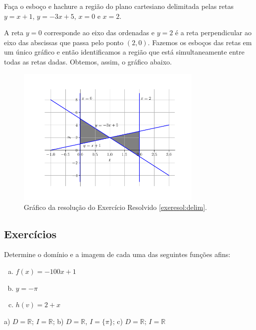 \begin{exeresol}\label{exeresol:delim}
  Faça o esboço e hachure a região do plano cartesiano delimitada pelas retas $y=x+1$, $y=-3x+5$, $x=0$ e $x=2$.
\end{exeresol}
\begin{resol}
  A reta $y = 0$ corresponde ao eixo das ordenadas e $y=2$ é a reta perpendicular ao eixo das abscissas que passa pelo ponto $(2,0)$. Fazemos os esboços das retas em um único gráfico e então identificamos a região que está simultaneamente entre todas as retas dadas. Obtemos, assim, o gráfico abaixo.
  \begin{figure}[H]
    \centering
    \includegraphics[width=0.8\textwidth]{cap_funcao/dados/fig_exeresol_delim/fig}
    \caption{Gráfico da resolução do Exercício Resolvido \ref{exeresol:delim}.}
    \label{fig:exeresol_delim}
  \end{figure}
\end{resol}

\subsection*{Exercícios}

\begin{exer}
  Determine o domínio e a imagem de cada uma das seguintes funções afins:
  \begin{enumerate}[a)]
  \item $f(x) = -100x + 1$
  \item $y = -\pi$
  \item $h(v) = 2 + x$
  \end{enumerate}
\end{exer}
\begin{resp}
  a) $D=\mathbb{R}$; $I=\mathbb{R}$; b) $D=\mathbb{R}$, $I=\{\pi\}$; c) $D=\mathbb{R}$; $I=\mathbb{R}$
\end{resp}

